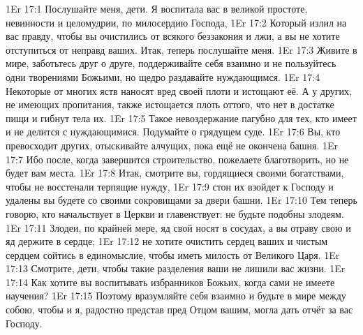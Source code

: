 \vs 1Er 17:1
Послушайте меня, дети.
Я воспитала вас в великой простоте,
невинности и целомудрии, по милосердию Господа,
\vs 1Er 17:2
Который излил на вас
правду, чтобы вы очистились от всякого беззакония и лжи, а вы не хотите
отступиться от неправд ваших. Итак, теперь послушайте меня.
\vs 1Er 17:3
Живите в мире, заботьтесь
друг о друге, поддерживайте себя взаимно и не пользуйтесь одни творениями
Божьими, но щедро раздавайте нуждающимся.
\vs 1Er 17:4
Некоторые от многих яств
наносят вред своей плоти и истощают её.
А у других, не имеющих пропитания,
также истощается плоть оттого,
что нет в достатке пищи и гибнут тела их.
\vs 1Er 17:5
Такое невоздержание пагубно для тех,
кто имеет и не делится с нуждающимися.
Подумайте о грядущем суде.
\vs 1Er 17:6
Вы, кто превосходит других, отыскивайте алчущих,
пока ещё не окончена башня.
\vs 1Er 17:7
Ибо после, когда завершится строительство,
пожелаете благотворить, но не будет вам места.
\vs 1Er 17:8
Итак, смотрите вы, гордящиеся своими богатствами,
чтобы не восстенали терпящие нужду,
\vs 1Er 17:9
стон их взойдет к Господу
и удалены вы будете со своими сокровищами за двери башни.
\vs 1Er 17:10
Тем теперь говорю, кто
начальствует в Церкви и главенствует: не будьте подобны злодеям.
\vs 1Er 17:11
Злодеи, по крайней мере, яд свой носят в сосудах,
а вы отраву свою и яд держите в сердце;
\vs 1Er 17:12
не хотите очистить сердец
ваших и чистым сердцем сойтись в единомыслие,
чтобы иметь милость от Великого Царя.
\vs 1Er 17:13
Смотрите, дети, чтобы такие разделения ваши не лишили вас жизни.
\vs 1Er 17:14
Как хотите вы воспитывать избранников Божьих,
когда сами не имеете научения?
\vs 1Er 17:15
Поэтому вразумляйте себя взаимно и будьте в мире между собою,
чтобы и я, радостно представ пред Отцом вашим,
могла дать отчёт за вас Господу.

